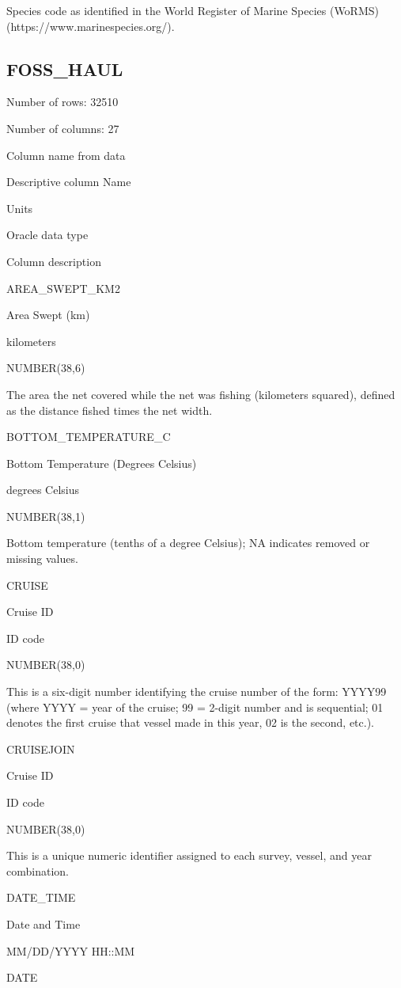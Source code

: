 \documentclass[
  letterpaper,
  oneside,
  open=any]{scrbook}
\begin{document}
Species code as identified in the World Register of Marine Species
(WoRMS) (https://www.marinespecies.org/).

\hypertarget{foss_haul}{%
\subsection{FOSS\_HAUL}\label{foss_haul}}

Number of rows: 32510

Number of columns: 27

Column name from data

Descriptive column Name

Units

Oracle data type

Column description

AREA\_SWEPT\_KM2

Area Swept (km)

kilometers

NUMBER(38,6)

The area the net covered while the net was fishing (kilometers squared),
defined as the distance fished times the net width.

BOTTOM\_TEMPERATURE\_C

Bottom Temperature (Degrees Celsius)

degrees Celsius

NUMBER(38,1)

Bottom temperature (tenths of a degree Celsius); NA indicates removed or
missing values.

CRUISE

Cruise ID

ID code

NUMBER(38,0)

This is a six-digit number identifying the cruise number of the form:
YYYY99 (where YYYY = year of the cruise; 99 = 2-digit number and is
sequential; 01 denotes the first cruise that vessel made in this year,
02 is the second, etc.).

CRUISEJOIN

Cruise ID

ID code

NUMBER(38,0)

This is a unique numeric identifier assigned to each survey, vessel, and
year combination.

DATE\_TIME

Date and Time

MM/DD/YYYY HH::MM

DATE
\end{document}
